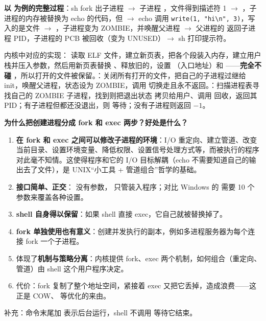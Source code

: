 \textbf{以  为例的完整过程}：sh fork 出子进程 $\to$ 子进程 ，文件得到描述符 1 $\to$ ，子进程的内存被替换为 echo 的代码，但 $\to$ echo 调用 \texttt{write(1, "hi\textbackslash n", 3)}，写入的是文件 $\to$ ，子进程变为 ZOMBIE，并唤醒父进程 $\to$ 父进程的  返回子进程 PID，子进程的 PCB 被回收（变为 UNUSED）$\to$ sh 打印提示符。

内核中对应的实现： 读取 ELF 文件，建立新页表，把各个段装入内存，建立用户栈并压入参数，然后用新页表替换 、释放旧的，设置 （入口地址）和 ——\textbf{完全不碰 }，所以打开的文件被保留。：关闭所有打开的文件，把自己的子进程过继给 init，唤醒父进程，状态设为 ZOMBIE，调用  切换走且永不返回。：扫描进程表寻找自己的 ZOMBIE 子进程，找到则把退出状态  拷贝给用户、调用  回收，返回其 PID；有子进程但都还没退出，则  等待；没有子进程则返回 $-1$。

\textbf{为什么把创建进程分成 fork 和 exec 两步？好处是什么？}
\begin{enumerate}
    \item \textbf{在 fork 和 exec 之间可以修改子进程的环境}：I/O 重定向、建立管道、改变当前目录、设置环境变量、降低权限、设置信号处理方式等，而被执行的程序对此毫不知情。这使得程序和它的 I/O 目标解耦（echo 不需要知道自己的输出去了文件），是 UNIX“小工具 + 管道组合”哲学的基础。
    \item \textbf{接口简单、正交}： 没有参数， 只管装入程序；对比 Windows 的  需要 10 个参数来覆盖各种设置。
    \item \textbf{shell 自身得以保留}：如果 shell 直接 exec，它自己就被替换掉了。
    \item \textbf{fork 单独使用也有意义}：创建并发执行的副本，例如多进程服务器为每个连接 fork 一个子进程。
    \item 体现了\textbf{机制与策略分离}：内核提供 fork、exec 两个机制，如何组合（重定向、管道）由 shell 这个用户程序决定。
    \item 代价：fork 复制了整个地址空间，紧接着 exec 又把它丢掉，造成浪费——这正是 COW、 等优化的来由。
\end{enumerate}
补充：命令末尾加 \cd{&} 表示后台运行，shell 不调用  等待它结束。
